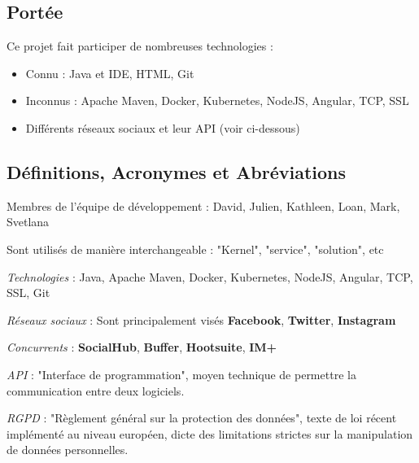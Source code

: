 \documentclass[11pt]{article}
\begin{document}
\subsection{Portée}


Ce projet fait participer de nombreuses technologies :
\begin{itemize}
	\item Connu : Java et IDE, HTML, Git
	\item Inconnus : Apache Maven, Docker, Kubernetes, NodeJS, Angular, TCP, SSL
	\item Différents réseaux sociaux et leur API (voir ci-dessous)
\end{itemize}

\subsection{Définitions, Acronymes et Abréviations}


Membres de l'équipe de développement : David, Julien, Kathleen, Loan, Mark, Svetlana

Sont utilisés de manière interchangeable : "Kernel", "service", "solution", etc

\textit{Technologies} : Java, Apache Maven, Docker, Kubernetes, NodeJS, Angular, TCP, SSL, Git

\textit{Réseaux sociaux} : Sont principalement visés \textbf{Facebook}, \textbf{Twitter}, \textbf{Instagram}

\textit{Concurrents} : \textbf{SocialHub}, \textbf{Buffer}, \textbf{Hootsuite}, \textbf{IM+}

\textit{API} : "Interface de programmation", moyen technique de permettre la communication entre deux logiciels.

\textit{RGPD} : "Règlement général sur la protection des données", texte de loi récent implémenté au niveau européen, dicte des limitations strictes sur la manipulation de données personnelles.

%

%
\end{document}
